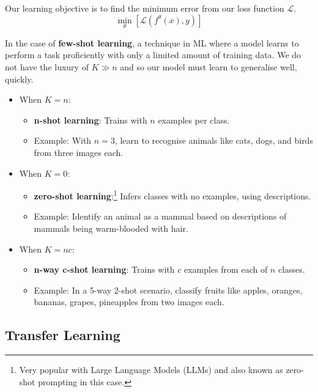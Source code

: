 Our learning objective is to find the minimum error from our loss function $\mathcal{L}$.
\begin{equation}
    \min_\theta \left[ \mathcal{L}(f^\theta(x),y) \right]
\end{equation}

In the case of \textbf{few-shot learning}, a technique in ML where a model learns to perform a task proficiently with only a limited amount of training data. We do not have the luxury of $K \gg n$ and so our model must learn to generalise well, quickly.


\begin{itemize}[noitemsep]
    \item When $K = n$:
          \begin{itemize}[noitemsep]
              \item \textbf{n-shot learning}: Trains with $n$ examples per class.
              \item Example: With $n=3$, learn to recognise animals like cats, dogs, and birds from three images each.
          \end{itemize}
    \item When $K = 0$:
          \begin{itemize}[noitemsep]
              \item \textbf{zero-shot learning}:\footnote[][]{Very popular with Large Language Models (LLMs) and also known as zero-shot prompting in this case.} Infers classes with no examples, using descriptions.
              \item Example: Identify an animal as a mammal based on descriptions of mammals being warm-blooded with hair.
          \end{itemize}
    \item When $K = nc$:
          \begin{itemize}[noitemsep]
              \item \textbf{n-way c-shot learning}: Trains with $c$ examples from each of $n$ classes.
              \item Example: In a 5-way 2-shot scenario, classify fruits like apples, oranges, bananas, grapes, pineapples from two images each.
          \end{itemize}
\end{itemize}


\subsection{Transfer Learning}

